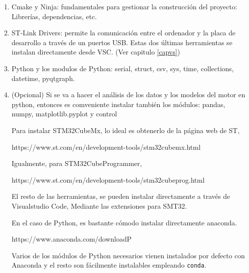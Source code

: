 \begin{enumerate}
\begin{itemize}
	\item GNU C/C++ for Arm® toolchain tales como arm-none-abi-gcc(compilador), arm-none-abi-nm (symbol viewer) y otros.
	\item GDB debugger cliente y servidor (Depurador). Depurar el programa ejecutándolo en la propia placa
	\item STM32CubeProgrammer (STM32CubeProg) utility (Programador) Descargar el ejecutable desde el ordenador a la placa.
	\item System view descriptor files (.SVD) for the entire STM32 MCU portfolio.
    \item Map file associating STM32 MCUs and MCU development boards to the appropriate SVD 
\end{itemize}

	\item Cmake y Ninja: fundamentales para gestionar la construcción del proyecto: Librerías, dependencias, etc.
	
	\item ST-Link Drivers: permite la comunicación entre el ordenador y la placa de desarrollo a través de un puertos USB. Estas dos últimas herramientas se instalan directamente desde VSC. (Ver capitulo \ref{capvs})
	\item Python y los modulos de Python: serial, struct, csv, sys, time, collections, datetime, pyqtgraph.
	\item (Opcional) Si se va a hacer el análisis de los datos y los modelos del motor en python, entonces es comveniente instalar también los módulos: pandas, numpy, matplotlib.pyplot y control
	
Para instalar STM32CubeMx, lo ideal es obtenerlo de la página web de ST,

\noindent https://www.st.com/en/development-tools/stm32cubemx.html

Igualmente, para STM32CubeProgrammer,

\noindent
https://www.st.com/en/development-tools/stm32cubeprog.html

El resto de las herramientas, se pueden instalar directamente a través de Visualstudio Code, Mediante las extensiones para SMT32.

En el caso de Python, es bastante cómodo instalar directamente anaconda.

https://www.anaconda.com/downloadP

Varios de los módulos de Python necesarios vienen instalados por defecto con Anaconda y el resto son fácilmente instalables empleando \texttt{conda}.
 
\end{enumerate}
